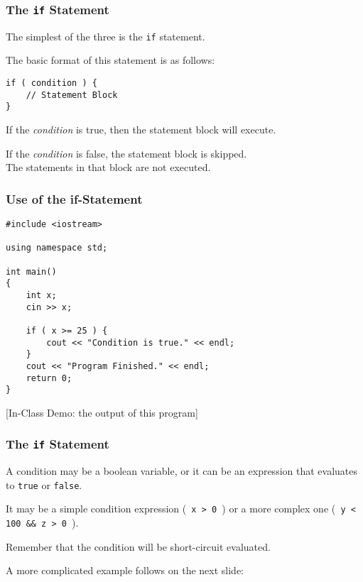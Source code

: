 \begin{frame}[fragile]
\frametitle{The \texttt{if} Statement}

The simplest of the three is the \texttt{if} statement.

The basic format of this statement is as follows:

\begin{verbatim}
if ( condition ) {
    // Statement Block
}
\end{verbatim}

If the \textit{condition} is true, then the statement block will execute.

If the \textit{condition} is false, the statement block is skipped.\\
\quad The statements in that block are not executed.

\end{frame}

\begin{frame}[fragile]
\frametitle{Use of the if-Statement}

\begin{verbatim}
#include <iostream>

using namespace std;

int main()
{
    int x;
    cin >> x;
    
    if ( x >= 25 ) {
        cout << "Condition is true." << endl;
    }
    cout << "Program Finished." << endl;    
    return 0;
}
\end{verbatim}

[In-Class Demo: the output of this program]

\end{frame}

\begin{frame}
\frametitle{The \texttt{if} Statement}
A condition may be a boolean variable, or it can be an expression that evaluates to \texttt{true} or \texttt{false}.

It may be a simple condition expression (\texttt{ x > 0 }) or a more complex one (\texttt{ y < 100 \&\& z > 0 }).

Remember that the condition will be short-circuit evaluated.

A more complicated example follows on the next slide:

\end{frame}

